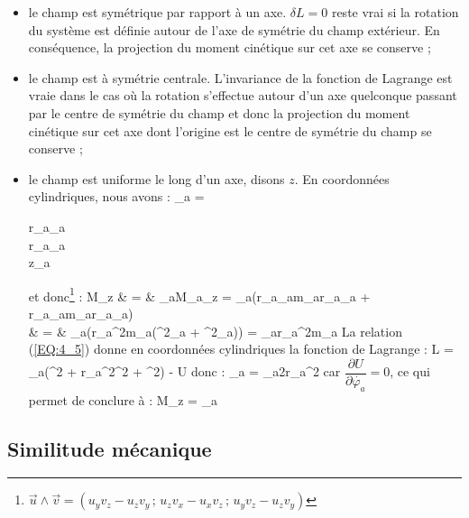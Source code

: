 \begin{itemize}
	\item le champ est sym\'etrique par rapport \`a un axe. $\delta L = 0$ reste vrai si la rotation du syst\`eme est d\'efinie autour de l'axe de sym\'etrie du champ ext\'erieur. En cons\'equence, la projection du moment cin\'etique sur cet axe se conserve ;
	\item le champ est \`a sym\'etrie centrale. L'invariance de la fonction de Lagrange est vraie dans le cas o\`u la rotation s'effectue autour d'un axe quelconque passant par le centre de sym\'etrie du champ et donc la projection du moment cin\'etique sur cet axe dont l'origine est le centre de sym\'etrie du champ se conserve ;
	\item le champ est uniforme le long d'un axe, disons $z$. En coordonn\'ees cylindriques, nous avons :
	\benn
		_{a} = \begin{pmatrix} r_{a}\cos\varphi_{a} \\ r_{a}\sin\varphi_{a} \\ z_{a} \end{pmatrix}
	\eenn
	et donc\footnote{$\vec{u}\wedge\vec{v} = (u_{y}v_{z}-u_{z}v_{y}\,;\,u_{z}v_{x}-u_{x}v_{z}\,;\,u_{y}v_{z}-u_{z}v_{y})$} :
	\bea
		M_{z} & = & \sum_{a}{M_{a}}_{z} = \sum_{a}\left(r_{a}\cos\varphi_{a}m_{a}r_{a}\cos\varphi_{a} + r_{a}\sin\varphi_{a}m_{a}r_{a}\sin\varphi_{a}\right) \nonumber \\
		& = & \sum_{a}\left(r_{a}^{2}m_{a}(\cos^{2}\varphi_{a} + \sin^{2}\varphi_{a})\right) = \sum_{a}r_{a}^{2}m_{a} \label{EQ:9_8}
	\eea
	La relation (\ref{EQ:4_5}) donne en coordonn\'ees cylindriques la fonction de Lagrange :
	\benn
		L = \sum_{a}(^{2} + r_{a}^{2}^{2} + ^{2}) - U
	\eenn
	donc :
	\benn
		\sum_{a} = \sum_{a}2r_{a}^{2}
	\eenn
	car $\dfrac{\partial U}{\partial \dot{\varphi_{a}}} = 0$, ce qui permet de conclure \`a :
	\be
		M_{z} = \sum_{a} \label{EQ:9_7}
	\ee
\end{itemize}

\subsection{Similitude m\'ecanique}

